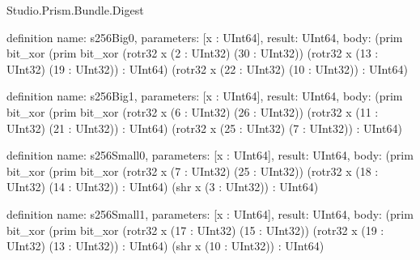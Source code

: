 \begin{lexlean}{Studio.Prism.Bundle.Digest}
\begin{semanticmodule}
definition{
  name: s256Big0,
  parameters: [x : UInt64],
  result: UInt64,
  body: (prim bit_xor (prim bit_xor (rotr32 x (2 : UInt32) (30 : UInt32)) (rotr32 x (13 : UInt32) (19 : UInt32)) : UInt64) (rotr32 x (22 : UInt32) (10 : UInt32)) : UInt64)
}

definition{
  name: s256Big1,
  parameters: [x : UInt64],
  result: UInt64,
  body: (prim bit_xor (prim bit_xor (rotr32 x (6 : UInt32) (26 : UInt32)) (rotr32 x (11 : UInt32) (21 : UInt32)) : UInt64) (rotr32 x (25 : UInt32) (7 : UInt32)) : UInt64)
}

definition{
  name: s256Small0,
  parameters: [x : UInt64],
  result: UInt64,
  body: (prim bit_xor (prim bit_xor (rotr32 x (7 : UInt32) (25 : UInt32)) (rotr32 x (18 : UInt32) (14 : UInt32)) : UInt64) (shr x (3 : UInt32)) : UInt64)
}

definition{
  name: s256Small1,
  parameters: [x : UInt64],
  result: UInt64,
  body: (prim bit_xor (prim bit_xor (rotr32 x (17 : UInt32) (15 : UInt32)) (rotr32 x (19 : UInt32) (13 : UInt32)) : UInt64) (shr x (10 : UInt32)) : UInt64)
}


\end{semanticmodule}
\end{lexlean}
